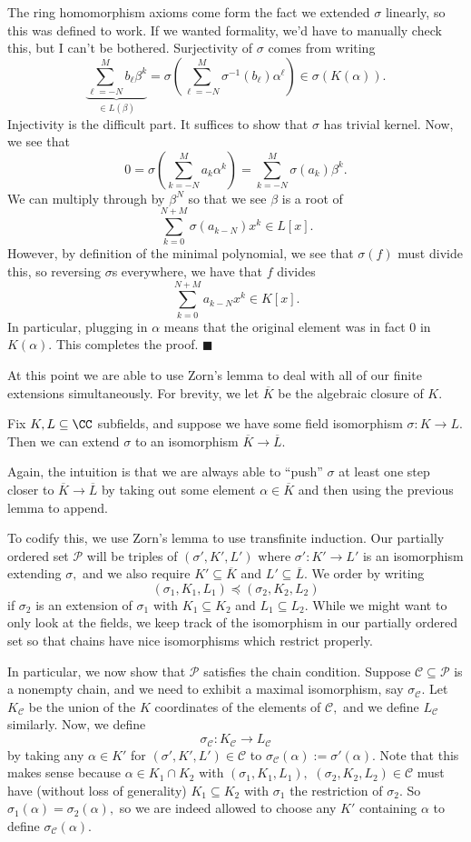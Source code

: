 The ring homomorphism axioms come form the fact we extended $\sigma$ linearly, so this was defined to work. If we wanted formality, we'd have to manually check this, but I can't be bothered. Surjectivity of $\sigma$ comes from writing
\[\underbrace{\sum_{\ell=-N}^Mb_\ell\beta^k}_{\in L(\beta)}=\sigma\left(\sum_{\ell=-N}^M\sigma^{-1}(b_\ell)\alpha^\ell\right)\in\sigma\left(K(\alpha)\right).\]
Injectivity is the difficult part. It suffices to show that $\sigma$ has trivial kernel. Now, we see that
\[0=\sigma\left(\sum_{k=-N}^Ma_k\alpha^k\right)=\sum_{k=-N}^M\sigma(a_k)\beta^k.\]
We can multiply through by $\beta^N$ so that we see $\beta$ is a root of
\[\sum_{k=0}^{N+M}\sigma(a_{k-N})x^k\in L[x].\]
However, by definition of the minimal polynomial, we see that $\sigma(f)$ must divide this, so reversing $\sigma$s everywhere, we have that $f$ divides
\[\sum_{k=0}^{N+M}a_{k-N}x^k\in K[x].\]
In particular, plugging in $\alpha$ means that the original element was in fact $0$ in $K(\alpha).$ This completes the proof. $\blacksquare$

At this point we are able to use Zorn's lemma to deal with all of our finite extensions simultaneously. For brevity, we let $\overline K$ be the algebraic closure of $K.$
\begin{proposition}
    Fix $K,L\subseteq\CC$ subfields, and suppose we have some field isomorphism $\sigma:K\to L.$ Then we can extend $\sigma$ to an isomorphism $\overline K\to\overline L.$
\end{proposition}
Again, the intuition is that we are always able to ``push'' $\sigma$ at least one step closer to $\overline K\to\overline L$ by taking out some element $\alpha\in\overline K$ and then using the previous lemma to append.

To codify this, we use Zorn's lemma to use transfinite induction. Our partially ordered set $\mathcal P$ will be triples of $(\sigma',K',L')$ where $\sigma':K'\to L'$ is an isomorphism extending $\sigma,$ and we also require $K'\subseteq\overline K$ and $L'\subseteq\overline L.$ We order by writing
\[(\sigma_1,K_1,L_1)\preceq(\sigma_2,K_2,L_2)\]
if $\sigma_2$ is an extension of $\sigma_1$ with $K_1\subseteq K_2$ and $L_1\subseteq L_2.$ While we might want to only look at the fields, we keep track of the isomorphism in our partially ordered set so that chains have nice isomorphisms which restrict properly.

In particular, we now show that $\mathcal P$ satisfies the chain condition. Suppose $\mathcal C\subseteq\mathcal P$ is a nonempty chain, and we need to exhibit a maximal isomorphism, say $\sigma_\mathcal C.$ Let $K_\mathcal C$ be the union of the $K$ coordinates of the elements of $\mathcal C,$ and we define $L_\mathcal C$ similarly. Now, we define
\[\sigma_\mathcal C:K_\mathcal C\to L_\mathcal C\]
by taking any $\alpha\in K'$ for $(\sigma',K',L')\in\mathcal C$ to $\sigma_\mathcal C(\alpha):=\sigma'(\alpha).$ Note that this makes sense because $\alpha\in K_1\cap K_2$ with $(\sigma_1,K_1,L_1),$ $(\sigma_2,K_2,L_2)\in\mathcal C$ must have (without loss of generality) $K_1\subseteq K_2$ with $\sigma_1$ the restriction of $\sigma_2.$ So $\sigma_1(\alpha)=\sigma_2(\alpha),$ so we are indeed allowed to choose any $K'$ containing $\alpha$ to define $\sigma_\mathcal C(\alpha).$

